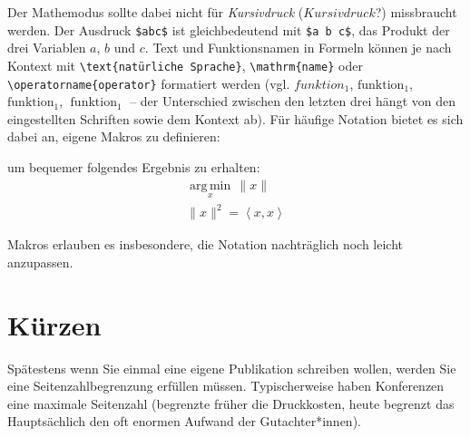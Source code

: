 Der Mathemodus sollte dabei nicht für \emph{Kursivdruck} ($Kursivdruck$?) missbraucht werden.
Der Ausdruck \texttt{\$abc\$} ist gleichbedeutend mit \texttt{\$a b c\$}, das Produkt der drei Variablen $a$, $b$ und $c$.
Text und Funktionsnamen in Formeln können je nach Kontext mit \texttt{\textbackslash{}text\{natürliche Sprache\}},
\texttt{\textbackslash{}mathrm\{name\}} oder \texttt{\textbackslash operatorname\{operator\}} formatiert werden
(vgl.{} $funktion_1$, $\text{funktion}_1$, $\mathrm{funktion}_1$, $\operatorname{funktion}_1$
-- der Unterschied zwischen den letzten drei hängt von den eingestellten Schriften sowie dem Kontext ab).
Für häufige Notation bietet es sich dabei an, eigene Makros zu definieren:
\bgroup

%
\egroup
um bequemer folgendes Ergebnis zu erhalten:
\begin{align*}
\operatorname*{arg\,min}_x \, \lVert {x} \rVert
\\
\lVert {x} \rVert^2 = \left< {x}, {x} \right>
\end{align*}

Makros erlauben es insbesondere, die Notation nachträglich noch leicht anzupassen.

\section{Kürzen}

Spätestens wenn Sie einmal eine eigene Publikation schreiben wollen, werden Sie
eine Seitenzahlbegrenzung erfüllen müssen. Typischerweise haben Konferenzen eine
maximale Seitenzahl (begrenzte früher die Druckkosten, heute begrenzt das
Hauptsächlich den oft enormen Aufwand der Gutachter*innen).

